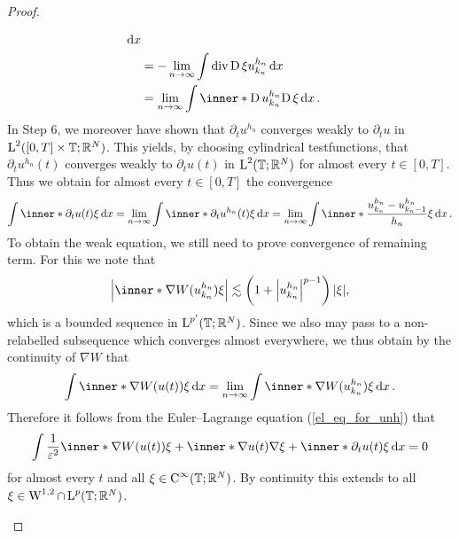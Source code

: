 \begin{proof}
\begin{description}[wide=0pt]
\begin{align*}
			\dd{ x }
			\\
			& = 
			-
			\lim_{ n \to \infty }
			\int
			\divg \diff \xi u_{ k_{ n } }^{ h_{ n } } 
			\dd{x }
			\\
			& = 
			\lim_{ n \to \infty }
			\int
			\inner*{ \diff u_{ k_{ n } }^{ h_{ n } } }{ \diff \xi }
			\dd{ x }.
		\end{align*}
		In Step 6, we moreover have shown that $ \partial_{ t } u^{ h_{ n } } $ 
		converges weakly to $ \partial_{t } u $ in $ \operatorname{L}^{ 2 } ( [ 0, T ] 
		\times \operatorname{\mathbb{T}} ; \mathbb{ R }^{ N } ) $. This yields, by choosing 
		cylindrical testfunctions, that $ \partial_{ t } u^{ h_{ n } } ( t ) $ 
		converges weakly to $ \partial_{ t } u ( t ) $ in $ \operatorname{L}^{ 2 } ( 
		\operatorname{\mathbb{T}} ; \mathbb{ R }^{ N } ) $ for almost every $ t \in [ 0 , T ] 
		$.
		Thus we obtain for almost every $ t\in [ 0 , T ] $ the convergence
		\begin{equation*}
			\int
			\inner*{ \partial_{ t } u ( t ) }{ \xi }
			\dd{ x }
			=
			\lim_{ n \to \infty }
			\int
			\inner*{ \partial_{ t } u^{ h_{ n } } ( t ) }{ \xi }
			\dd{ x }
			=
			\lim_{ n \to \infty }
			\int
			\inner*{ \frac{ u_{ k_{ n } }^{ h_{ n } } - u_{ k_{ n } - 1 }^{ h_{ n } } }{ h_{ n } } }{ \xi }
			\dd{ x }.
		\end{equation*}
		To obtain the weak equation, we still need to prove convergence of remaining term. For this we note that 
		\begin{equation*}
			\abs{ \inner*{ \nabla W ( u_{ k_{ n } }^{ h_{ n } } ) }{ \xi } }
			\lesssim
			\left( 1 + \abs{ u_{  k_{ n } }^{ h_{ n } } }^{ p - 1 } \right) \abs{ \xi },
		\end{equation*}
		which is a bounded sequence in $ \operatorname{L}^{ p'} ( \operatorname{\mathbb{T}} ; \mathbb{ R 
		}^{ N } ) $. Since we also may pass to a non-relabelled subsequence 
		which converges almost everywhere, we thus obtain by the continuity of 
		$ \nabla W $ that
		\begin{equation*}
			\int
			\inner*{ \nabla W ( u ( t ) ) }{ \xi } 
			\dd{ x }
			=
			\lim_{ n \to \infty }
			\int
			\inner*{ \nabla W ( u_{ k_{ n } }^{ h_{ n } } ) }{ \xi }
			\dd{ x }.
		\end{equation*}
		Therefore it follows from the Euler--Lagrange equation (\ref{el_eq_for_unh}) that
		\begin{equation*}
			\int
			\frac{ 1 }{ \varepsilon^{ 2 } }
			\inner*{ \nabla W ( u ( t )) }{ \xi }
			+
			\inner*{ \nabla u( t ) }{ \nabla \xi }
			+
			\inner*{ \partial_{ t } u ( t ) }{ \xi }
			\dd{ x }
			=
			0
		\end{equation*}
		for almost every $ t $ and all $ \xi \in \operatorname{C}^{ \infty } ( \operatorname{\mathbb{T}} 
		; \mathbb{ R }^{ N } ) $. By continuity this extends to all $ \xi \in 
		\operatorname{W}^{ 1 , 2 } \cap \operatorname{L}^{ p } ( \mathbb{ T } ; \mathbb{ R }^{ N } ) $.
		

\end{description}
\end{proof}
